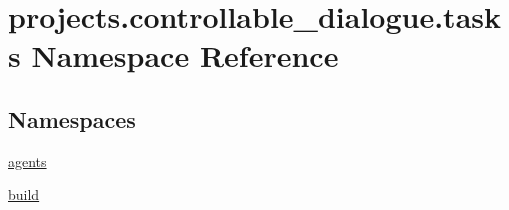 \hypertarget{namespaceprojects_1_1controllable__dialogue_1_1tasks}{}\section{projects.\+controllable\+\_\+dialogue.\+tasks Namespace Reference}
\label{namespaceprojects_1_1controllable__dialogue_1_1tasks}
\subsection*{Namespaces}
\begin{DoxyCompactItemize}
\item 
 \hyperlink{namespaceprojects_1_1controllable__dialogue_1_1tasks_1_1agents}{agents}
\item 
 \hyperlink{namespaceprojects_1_1controllable__dialogue_1_1tasks_1_1build}{build}
\end{DoxyCompactItemize}
